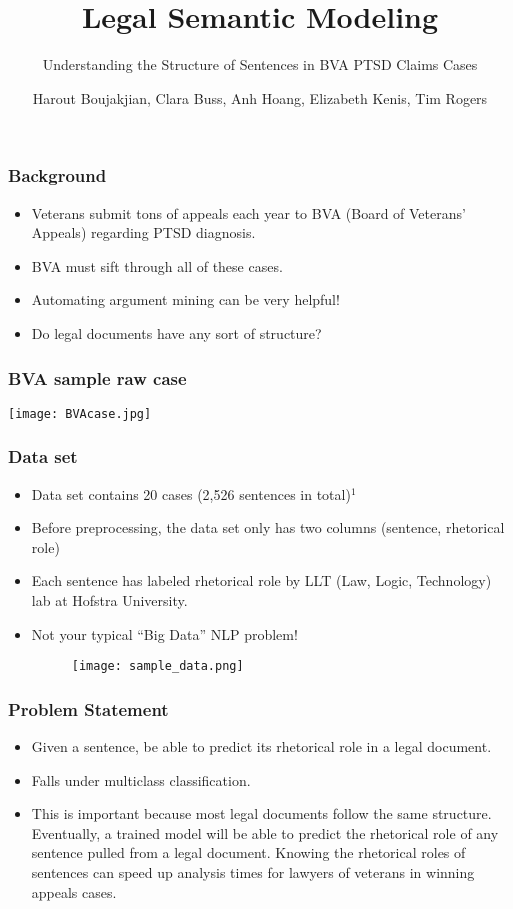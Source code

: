 \documentclass{beamer}
\title{Legal Semantic Modeling}
\subtitle{Understanding the Structure of Sentences in BVA PTSD Claims Cases}
\author{Harout Boujakjian, Clara Buss, Anh Hoang, Elizabeth Kenis, Tim Rogers}
\institute{George Mason University}
\begin{document}
\maketitle


\begin{frame}
  \frametitle{Background}
  \footnotesize
  \begin{itemize}
  \item Veterans submit tons of appeals each year to BVA (Board of Veterans' Appeals) regarding PTSD diagnosis.
  \item BVA must sift through all of these cases.
  \item Automating argument mining can be very helpful!
  \item Do legal documents have any sort of structure?
  \end{itemize}
\end{frame}

\begin{frame}
  \frametitle{BVA sample raw case}
  \centering
  \texttt{[image: BVAcase.jpg]}
\end{frame}

\begin{frame}
  \frametitle{Data set}
  \begin{itemize}
  \item Data set contains 20 cases (2,526 sentences in total)$^1$
  \item Before preprocessing, the data set only has two columns (sentence, rhetorical role)
  \item Each sentence has labeled rhetorical role by LLT (Law, Logic, Technology) lab at Hofstra University.
  \item Not your typical ``Big Data'' NLP problem! 
    \begin{figure}
      \texttt{[image: sample\_data.png]}
    \end{figure}
  \end{itemize}
\end{frame}

\begin{frame}
  \frametitle{Problem Statement}
  \begin{itemize}
  \item Given a sentence, be able to predict its rhetorical role in a legal document.
  \item Falls under multiclass classification.
  \item This is important because most legal documents follow the same structure. Eventually, a trained model will be able to predict the rhetorical role of any sentence pulled from a legal document. Knowing the rhetorical roles of sentences can speed up analysis times for lawyers of veterans in winning appeals cases.
  \end{itemize}
\end{frame}
\end{document}
